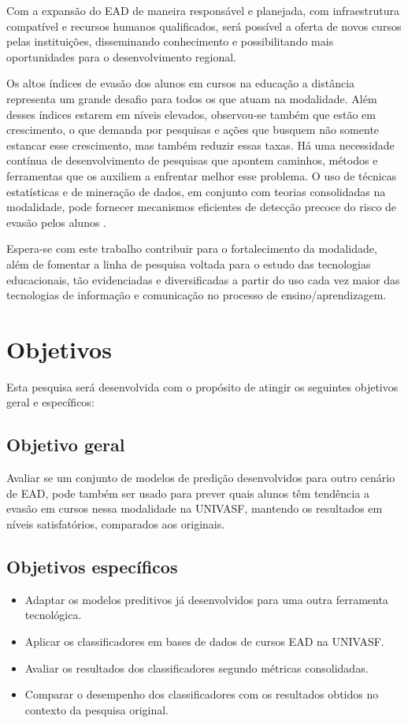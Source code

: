 Com a expansão do EAD de maneira responsável e planejada, com infraestrutura
compatível e recursos humanos qualificados, será possível a oferta de novos
cursos pelas instituições, disseminando conhecimento e possibilitando mais
oportunidades para o desenvolvimento regional.

Os altos índices de evasão dos alunos em cursos na educação a distância
representa um grande desafio para todos os que atuam na modalidade. Além desses
índices estarem em níveis elevados, observou-se também que estão em crescimento,
o que demanda por pesquisas e ações que busquem não somente estancar esse
crescimento, mas também reduzir essas taxas. Há uma necessidade contínua de
desenvolvimento de pesquisas que apontem caminhos, métodos e ferramentas que os
auxiliem a enfrentar melhor esse problema. O uso de técnicas estatísticas e de
mineração de dados, em conjunto com teorias consolidadas na modalidade, pode
fornecer mecanismos eficientes de detecção precoce do risco de evasão pelos
alunos \cite{ramos2016abordagem}.

Espera-se com este trabalho contribuir para o fortalecimento da modalidade, além
de fomentar a linha de pesquisa voltada para o estudo das tecnologias
educacionais, tão evidenciadas e diversificadas a partir do uso cada vez maior
das tecnologias de informação e comunicação no processo de ensino/aprendizagem.

\section{Objetivos}

Esta pesquisa será desenvolvida com o propósito de atingir os seguintes
objetivos geral e específicos:

\subsection{Objetivo geral}

Avaliar se um conjunto de modelos de predição desenvolvidos para outro cenário
de EAD, pode também ser usado para prever quais alunos têm tendência a evasão em
cursos nessa modalidade na UNIVASF, mantendo os resultados em níveis
satisfatórios, comparados aos originais.

\subsection{Objetivos específicos}
\begin{itemize}
  \item Adaptar os modelos preditivos já desenvolvidos para uma outra ferramenta
  tecnológica.
  \item Aplicar os classificadores em bases de dados de cursos EAD na UNIVASF.
  \item Avaliar os resultados dos classificadores segundo métricas consolidadas.
  \item Comparar o desempenho dos classificadores com os resultados obtidos no
  contexto da pesquisa original.
\end{itemize}
